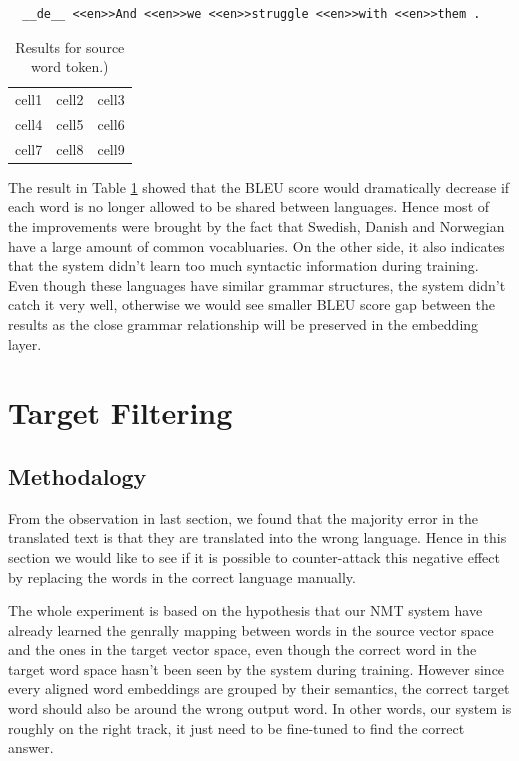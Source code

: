 \documentclass[thesis,fonts=libertine]{cluu}
\begin{document}
\begin{verbatim}
  __de__ <<en>>And <<en>>we <<en>>struggle <<en>>with <<en>>them .
\end{verbatim}

\begin{table}
  \centering
  \begin{tabular}{c c c}
    cell1 & cell2 & cell3 \\ 
    cell4 & cell5 & cell6 \\  
    cell7 & cell8 & cell9 
  \end{tabular}
  \caption{Results for source word token.)}
  \label{table:word_token}
\end{table}

The result in Table \ref{table:word_token} showed that the BLEU score would dramatically decrease if each word is no longer allowed to be shared between languages. Hence most of the improvements were brought by the fact that Swedish, Danish and Norwegian have a large amount of common vocabluaries. On the other side, it also indicates that the system didn't learn too much syntactic information during training. Even though these languages have similar grammar structures, the system didn't catch it very well, otherwise we would see smaller BLEU score gap between the results as the close grammar relationship will be preserved in the embedding layer.

\chapter{Target Filtering}
\label{chap:target_filtering}

\section{Methodalogy}

From the observation in last section, we found that the majority error in the translated text is that they are translated into the wrong language. Hence in this section we would like to see if it is possible to counter-attack this negative effect by replacing the words in the correct language manually.

The whole experiment is based on the hypothesis that our NMT system have already learned the genrally mapping between words in the source vector space and the ones in the target vector space, even though the correct word in the target word space hasn't been seen by the system during training. However since every aligned word embeddings are grouped by their semantics, the correct target word should also be around the wrong output word. In other words, our system is roughly on the right track, it just need to be fine-tuned to find the correct answer.
\end{document}
